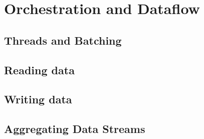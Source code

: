 \section{Orchestration and Dataflow}
\subsection{Threads and Batching}
\subsection{Reading data}
\subsection{Writing data}
\subsection{Aggregating Data Streams}